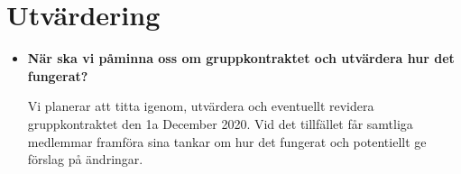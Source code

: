 \documentclass{mall}
\begin{document}
\newpage

\section{Utvärdering}

\begin{itemize}
\item \textbf{När ska vi påminna oss om gruppkontraktet och utvärdera hur det fungerat?}

  Vi planerar att titta igenom, utvärdera och eventuellt revidera gruppkontraktet den 1a December 2020. Vid det tillfället får samtliga medlemmar framföra sina tankar om hur det fungerat och potentiellt ge förslag på ändringar.

\end{itemize}
\end{document}
